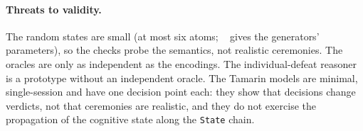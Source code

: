 \paragraph{Threats to validity.}
The random states are small (at most six atoms; ~ gives the generators' parameters), so the checks probe the semantics, not realistic ceremonies. The oracles are only as independent as the encodings. The individual-defeat reasoner is a prototype without an independent oracle. The Tamarin models are minimal, single-session and have one decision point each: they show that decisions change verdicts, not that ceremonies are realistic, and they do not exercise the propagation of the cognitive state along the \texttt{State} chain.
